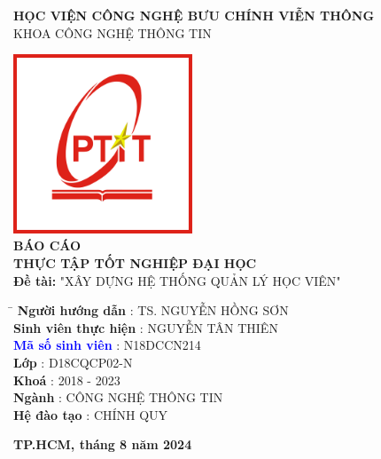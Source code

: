 \documentclass[report.tex]{subfiles}
\begin{document}
\begin{titlepage}



\begin{center}
    \textbf{HỌC VIỆN CÔNG NGHỆ BƯU CHÍNH VIỄN THÔNG}\\
    KHOA CÔNG NGHỆ THÔNG TIN\\
    \vspace{1cm}
    \vspace{-8pt}\hrulefill\raisebox{-2.1pt}\quad\decofourleft\decotwo\decofourright\quad\hrulefill

    \vspace{2cm}
    \centering\includegraphics[width=0.4\textwidth]{../meta/logo.PTIT.png}\\
    \vspace{2cm}
    \textbf{\Huge BÁO CÁO\\
        THỰC TẬP TỐT NGHIỆP ĐẠI HỌC}\\
    \vspace{1cm}
    \textbf{\Large Đề tài:} {\large "XÂY DỰNG HỆ THỐNG QUẢN LÝ HỌC VIÊN"} \\

    \vfill

    \begin{tabbing}
        \hspace{8cm} \= \hspace{10cm} \kill
        \textbf{Người hướng dẫn} \> :  TS. NGUYỄN HỒNG SƠN \\
        \textbf{Sinh viên thực hiện} \> :  NGUYỄN TÂN THIÊN \\
        \textbf{\textcolor{blue}{Mã số sinh viên}} \> :  N18DCCN214 \\
        \textbf{Lớp} \> : D18CQCP02-N \\
        \textbf{Khoá} \> : 2018 - 2023 \\
        \textbf{Ngành} \> : CÔNG NGHỆ THÔNG TIN \\
        \textbf{Hệ đào tạo} \> : CHÍNH QUY \\
    \end{tabbing}

\end{center}
\vfill
\begin{center}
    \textbf{TP.HCM, tháng 8 năm 2024}
\end{center}

\end{titlepage}
\end{document}
